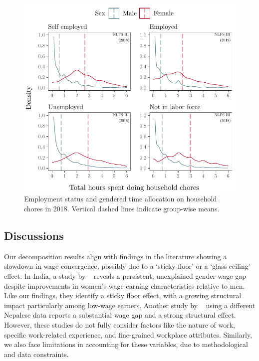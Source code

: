 \begin{figure}[htb!]
	\centering
	\includegraphics{./figure/chores_NLFS_III}
	\caption{Employment status and gendered time allocation on household chores in 2018. Vertical dashed lines indicate group-wise means.}
	\label{fig:chores_III}
\end{figure}

\subsection{Discussions}

Our decomposition results align with findings in the literature showing a slowdown in wage convergence, possibly due to a ‘sticky floor’ or a ‘glass ceiling’ effect. In India, a study by ~\citet{Deshpande2018} reveals a persistent, unexplained gender wage gap despite improvements in women’s wage-earning characteristics relative to men. Like our findings, they identify a sticky floor effect, with a growing structural impact particularly among low-wage earners. Another study by ~\citet{Yamamoto2019} using a different Nepalese data reports a substantial wage gap and a strong structural effect. However, these studies do not fully consider factors like the nature of work, specific work-related experience, and fine-grained workplace attributes. Similarly, we also face limitations in accounting for these variables, due to methodological and data constraints.\par

